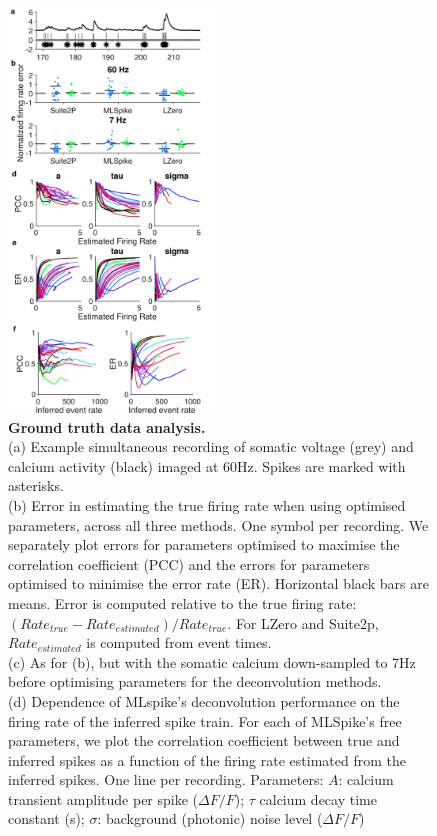 \documentclass[a4paper,11pt]{article}
\begin{document}
\begin{figure}
	\centering
	\includegraphics[width=0.5\textwidth]{composite_figs/fig1_ground_truth.png}
	\caption{\textbf{Ground truth data analysis.} \label{fig:GT_data} \\
		(a) Example simultaneous recording of somatic voltage (grey) and calcium activity (black) imaged at 60Hz. Spikes are marked with asterisks. \\ 
		(b) Error in estimating the true firing rate when using optimised parameters, across all three methods. One symbol per recording. We separately plot errors for parameters optimised to maximise the correlation coefficient (PCC) and the errors for parameters optimised to minimise the error rate (ER). Horizontal black bars are means. Error is computed relative to the true firing rate: $(Rate_{true} - Rate_{estimated}) / Rate_{true}$. For LZero and Suite2p, $Rate_{estimated}$ is computed from event times.  \\
		(c) As for (b), but with the somatic calcium down-sampled to 7Hz before optimising parameters for the deconvolution methods. \\
		(d) Dependence of MLspike's deconvolution performance on the firing rate of the inferred spike train. For each of MLSpike's free parameters, we plot the correlation coefficient between true and inferred spikes as a function of the firing rate estimated from the inferred spikes. One line per recording. Parameters: $A$: calcium transient amplitude per spike ($\Delta F/F$); $\tau$ calcium decay time constant (s); $\sigma$: background (photonic) noise level ($\Delta F/F$)\\
}
\end{figure}
\end{document}
